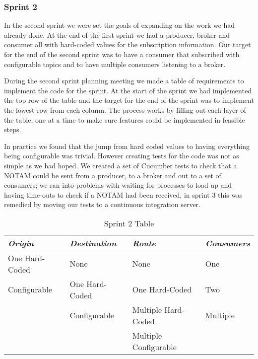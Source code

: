 \documentclass[a4paper, 12pt]{article}
\begin{document}
\subsubsection{Sprint 2}

In the second sprint we were set the goals of expanding on the work we had already done. At the end of the first sprint we had a producer, broker and consumer all with hard-coded values for the subscription information. Our target for the end of the second sprint was to have a consumer that subscribed with configurable topics and to have multiple consumers listening to a broker.

During the second sprint planning meeting we made a table of requirements to implement the code for the sprint. At the start of the sprint we had implemented the top row of the table and the target for the end of the sprint was to implement the lowest row from each column. The process works by filling out each layer of the table, one at a time to make sure features could be implemented in feasible steps.

In practice we found that the jump from hard coded values to having everything being configurable was trivial. However creating tests for the code was not as simple as we had hoped. We created a set of Cucumber tests to check that a NOTAM could be sent from a producer, to a broker and out to a set of consumers; we ran into problems with waiting for processes to load up and having time-outs to check if a NOTAM had been received, in sprint 3 this was remedied by moving our tests to a continuous integration server. 

\begin{table}
    \begin{tabular}{|l|l|l|l|}
    \hline
    \emph{Origin}         & \emph{Destination}    & \emph{Route}                 & \emph{Consumers} \\ \hline
    One Hard-Coded & None           & None                  & One       \\ \hline
    Configurable   & One Hard-Coded & One Hard-Coded        & Two       \\ \hline
    ~              & Configurable   & Multiple Hard-Coded   & Multiple  \\ \hline
    ~              & ~              & Multiple Configurable & ~         \\ \hline
    \end{tabular}
\caption{Sprint 2 Table}
\label{tab:sprint2}
\end{table}
\end{document}
